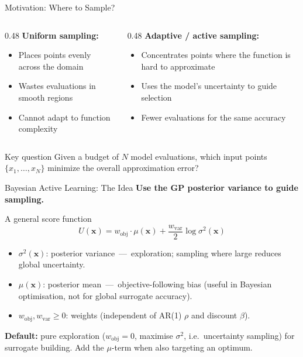 \documentclass[aspectratio=169,11pt]{beamer}
\newcommand{\emphc}[1]{\textcolor{harvardcrimson}{#1}}
\newcommand{\x}{\bm{x}}
\begin{document}
\begin{frame}{Motivation: Where to Sample?}
\begin{columns}[T]
\begin{column}{0.48\textwidth}
\textbf{Uniform sampling:}
\begin{itemize}
  \item Places points evenly across the domain
  \item Wastes evaluations in smooth regions
  \item Cannot adapt to function complexity
\end{itemize}
\end{column}
\begin{column}{0.48\textwidth}
\textbf{Adaptive / active sampling:}
\begin{itemize}
  \item Concentrates points where the function is \emphc{hard to approximate}
  \item Uses the model's \emphc{uncertainty} to guide selection
  \item Fewer evaluations for the same accuracy
\end{itemize}
\end{column}
\end{columns}

\vspace{0.5cm}
\begin{alertblock}{Key question}
Given a budget of $N$ model evaluations, which input points $\{x_1, \dots, x_N\}$ minimize the overall approximation error?
\end{alertblock}
\end{frame}

\begin{frame}{Bayesian Active Learning: The Idea}
\textbf{Use the GP posterior variance to guide sampling.}

\vspace{0.2cm}
\begin{block}{A general score function}
\vspace{-4pt}
\[
U(\x) = w_{\mathrm{obj}} \cdot \mu(\x) + \frac{w_{\mathrm{var}}}{2}\log\sigma^2(\x)
\]
\vspace{-8pt}
\begin{itemize}\setlength{\itemsep}{1pt}\small
  \item $\sigma^2(\x)$: posterior variance \,---\, \emphc{exploration}; sampling where large reduces global uncertainty.
  \item $\mu(\x)$: posterior mean \,---\, \emphc{objective-following} bias (useful in Bayesian optimisation, not for global surrogate accuracy).
  \item $w_{\mathrm{obj}}, w_{\mathrm{var}} \geq 0$: weights (independent of AR(1) $\rho$ and discount $\beta$).
\end{itemize}
\end{block}

\vspace{0.1cm}
{\small\textbf{Default:} pure exploration ($w_{\mathrm{obj}} = 0$, maximise $\sigma^2$, i.e.\ uncertainty sampling) for surrogate building. Add the $\mu$-term when also targeting an optimum.}
\end{frame}
\end{document}

